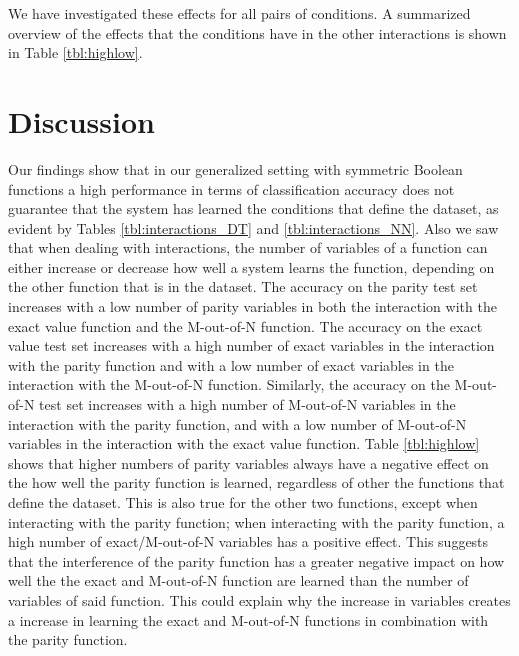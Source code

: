 \documentclass[letterpaper]{article} %
\begin{document}
We have investigated these effects for all pairs of conditions. A summarized overview of the effects that the conditions have in the other interactions is shown in Table \ref{tbl:highlow}. 

\begin{table}[b!]
\centering
\caption{This table shows the  effect that a high number of variables of a function has on the performance of a system (in terms of learning the function) for all functions that it interacts with.}
\label{tbl:highlow}
\end{table}


\section{Discussion}
Our findings show that in our generalized setting with symmetric Boolean functions a high performance in terms of classification accuracy does not guarantee that the system has learned the conditions that define the dataset, as evident by Tables \ref{tbl:interactions_DT} and \ref{tbl:interactions_NN}. Also we saw that when dealing with interactions, the number of variables of a function can either increase or decrease how well a system learns the function, depending on the other function that is in the dataset. The accuracy on the parity test set increases with a low number of parity variables in both the interaction with the exact value function and the M-out-of-N function. The accuracy on the exact value test set increases with a high number of exact variables in the interaction with the parity function and with a low number of exact variables in the interaction with the M-out-of-N function. Similarly, the accuracy on the M-out-of-N test set increases with a high number of M-out-of-N variables in the interaction with the parity function, and with a low number of M-out-of-N variables in the interaction with the exact value function. Table \ref{tbl:highlow}  shows that higher numbers of parity variables always have a negative effect on the how well the parity function is learned, regardless of other the functions that define the dataset. This is also true for the other two functions, except when interacting with the parity function; when interacting with the parity function, a high number of exact/M-out-of-N variables has a positive effect. This suggests that the interference of the parity function has a greater negative impact on how well the the exact and M-out-of-N function are learned than the number of variables of said function. This could explain why the increase in variables creates a increase in learning the exact and M-out-of-N functions in combination with the parity function. 
\end{document}
